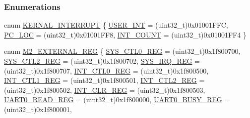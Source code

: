\subsubsection*{Enumerations}
\begin{DoxyCompactItemize}
\item 
enum \mbox{\hyperlink{a00020_a4ecccde27f29cedbe9bc6a22e3aad16f}{K\+E\+R\+N\+A\+L\+\_\+\+I\+N\+T\+E\+R\+R\+U\+PT}} \{ \mbox{\hyperlink{a00020_a4ecccde27f29cedbe9bc6a22e3aad16fa2c882d4b03fdd083b40f2807ea7c0bf2}{U\+S\+E\+R\+\_\+\+I\+NT}} = (uint32\+\_\+t)0x01001\+F\+FC, 
\mbox{\hyperlink{a00020_a4ecccde27f29cedbe9bc6a22e3aad16fa2a5bd1194e8dba9ee7ed1d1039942739}{P\+C\+\_\+\+L\+OC}} = (uint32\+\_\+t)0x01001\+F\+F8, 
\mbox{\hyperlink{a00020_a4ecccde27f29cedbe9bc6a22e3aad16fa529ec3035e124aebce1fd8b0a0b7c408}{I\+N\+T\+\_\+\+C\+O\+U\+NT}} = (uint32\+\_\+t)0x01001\+F\+F4
 \}
\item 
enum \mbox{\hyperlink{a00020_adadaa0ab1ebbd7ba9b70dfd24c3ed44d}{M2\+\_\+\+E\+X\+T\+E\+R\+N\+A\+L\+\_\+\+R\+EG}} \{ \newline
\mbox{\hyperlink{a00020_adadaa0ab1ebbd7ba9b70dfd24c3ed44dab61d9968d782d6c00e9de838e38913f5}{S\+Y\+S\+\_\+\+C\+T\+L0\+\_\+\+R\+EG}} = (uint32\+\_\+t)0x1f800700, 
\mbox{\hyperlink{a00020_adadaa0ab1ebbd7ba9b70dfd24c3ed44da7dd70f67b5962a7974603376399afb49}{S\+Y\+S\+\_\+\+C\+T\+L2\+\_\+\+R\+EG}} = (uint32\+\_\+t)0x1f800702, 
\mbox{\hyperlink{a00020_adadaa0ab1ebbd7ba9b70dfd24c3ed44da9c4ce03a199984a23165617318767eca}{S\+Y\+S\+\_\+\+I\+R\+Q\+\_\+\+R\+EG}} = (uint32\+\_\+t)0x1f800707, 
\mbox{\hyperlink{a00020_adadaa0ab1ebbd7ba9b70dfd24c3ed44da417bb62509b1343f4685a023c8ec4b09}{I\+N\+T\+\_\+\+C\+T\+L0\+\_\+\+R\+EG}} = (uint32\+\_\+t)0x1f800500, 
\newline
\mbox{\hyperlink{a00020_adadaa0ab1ebbd7ba9b70dfd24c3ed44dabc5f0d33bb47527f3d8a9c20250d5c5b}{I\+N\+T\+\_\+\+C\+T\+L1\+\_\+\+R\+EG}} = (uint32\+\_\+t)0x1f800501, 
\mbox{\hyperlink{a00020_adadaa0ab1ebbd7ba9b70dfd24c3ed44dafba45e74edabe7b9fd6d0c36e8492bcd}{I\+N\+T\+\_\+\+C\+T\+L2\+\_\+\+R\+EG}} = (uint32\+\_\+t)0x1f800502, 
\mbox{\hyperlink{a00020_adadaa0ab1ebbd7ba9b70dfd24c3ed44da33cabaff7369092ec0e29dd2ffb0cb3d}{I\+N\+T\+\_\+\+C\+L\+R\+\_\+\+R\+EG}} = (uint32\+\_\+t)0x1f800503, 
\mbox{\hyperlink{a00020_adadaa0ab1ebbd7ba9b70dfd24c3ed44da744e0b80c93cc5242d28ebff68af035c}{U\+A\+R\+T0\+\_\+\+R\+E\+A\+D\+\_\+\+R\+EG}} = (uint32\+\_\+t)0x1f800000, 
\newline
\mbox{\hyperlink{a00020_adadaa0ab1ebbd7ba9b70dfd24c3ed44daf27c578db5f1c598bc68d35594c46c3b}{U\+A\+R\+T0\+\_\+\+B\+U\+S\+Y\+\_\+\+R\+EG}} = (uint32\+\_\+t)0x1f800001, 

\end{DoxyCompactItemize}
